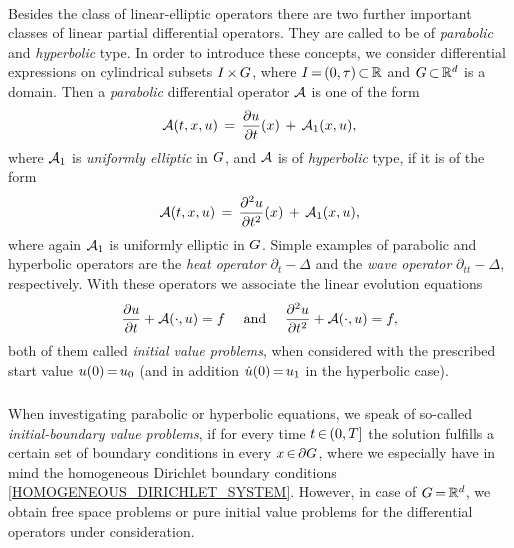 \documentclass[11pt,twoside]{article}
\begin{document}
\paragraph{} %
Besides the class of {linear-elliptic} operators
there are two further important classes
of linear partial differential operators.
They are called to be of \textit{parabolic} and \textit{hyperbolic} type.
In order to introduce these concepts,
we consider differential expressions on cylindrical subsets
$I {\,\times\,} G$,
where $I {\,=\,} (0,\tau) {\,\subset\,} {\mathbb{R}}$ and $G {\,\subset\,} {\mathbb{R}}^d$ is a domain.
Then a \textit{parabolic} differential operator ${\mathcal{A}}$ is one of the form
\[
{\mathcal{A}}(t,x,u) \,=\, \frac{\partial u}{\partial t}(x) \,+\, {\mathcal{A}}_1(x,u),
\]
where ${\mathcal{A}}_1$ is \textit{uniformly elliptic} in $G$,
and ${\mathcal{A}}$ is of \textit{hyperbolic} type,
if it is of the form
\[
{\mathcal{A}}(t,x,u) \,=\, \frac{\partial^2 u}{\partial t^2}(x) \,+\, {\mathcal{A}}_1(x,u),
\]
where again ${\mathcal{A}}_1$ is uniformly elliptic in $G$.
Simple examples of para\-bolic and hyper\-bolic operators are
the \textit{heat operator} $\partial_t    - \Delta$ and
the \textit{wave operator} $\partial_{tt} - \Delta$,
respectively.
With these operators we associate the linear evolution equations
\[
\frac{\partial u}{\partial t} + {\mathcal{A}}(\cdot,u) = f
\quad \mbox{ and } \quad
\frac{\partial^2 u}{\partial t^2} + {\mathcal{A}}(\cdot,u) = f,
\]
both of them called \textit{initial value problems},
when considered with the prescribed start value $u(0) {\,=\,} u_0$
(and in addition $\dot{u}(0) {\,=\,} u_1$ in the hyperbolic case).

\subparagraph{} %
When investigating parabolic or hyperbolic equations,
we speak of so-called \textit{initial-boundary value problems},
if for every time $t {\,\in\,} (0,T]$ the solution fulfills
a certain set of boundary conditions in every $x {\,\in\,} \partial G$,
where we especially have in mind the homogeneous Dirichlet boundary conditions
\eqref{HOMOGENEOUS_DIRICHLET_SYSTEM}.
However,
in case of $G {\,=\,} {\mathbb{R}}^d$,
we obtain free space problems or pure initial value problems
for the differential operators under consideration.
\end{document}
